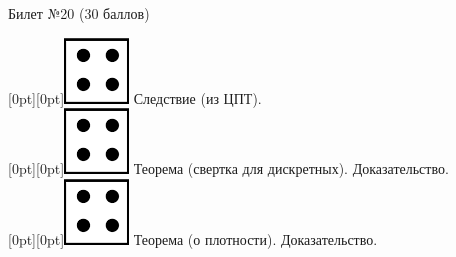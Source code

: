 \documentclass[10pt]{article}
\begin{document}
\thispagestyle{empty}

\topskip=0pt

\vspace*{\fill}

\begin{center} {\Large Билет №20 (30 баллов)} \end{center}

\raisebox{-1pt}[0pt][0pt]{\includegraphics[width=0.02\linewidth]{4.png}} Следствие (из ЦПТ). \\

\raisebox{-1pt}[0pt][0pt]{\includegraphics[width=0.02\linewidth]{4.png}} Теорема (свертка для дискретных).  Доказательство. \\

\raisebox{-1pt}[0pt][0pt]{\includegraphics[width=0.02\linewidth]{4.png}} Теорема (о плотности). Доказательство. \\









\vspace*{\fill}
\end{document}
